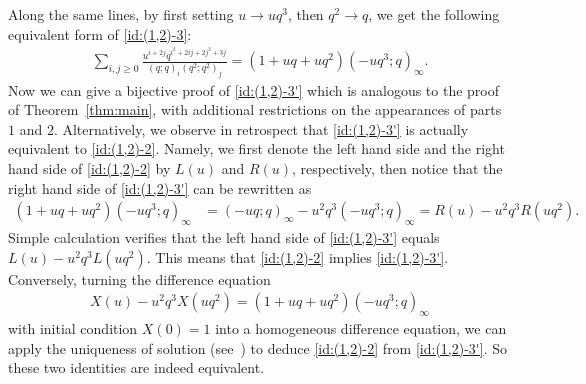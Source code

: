 \documentclass[11pt,reqno]{amsart}
\numberwithin{equation}{section}
\theoremstyle{plain}
\theoremstyle{definition}
\begin{document}
Along the same lines, by first setting $u\to uq^3$, then $q^2\to q$, we get the following equivalent form of \eqref{id:(1,2)-3}:
\begin{align}\label{id:(1,2)-3'}
\sum_{i, j\geq 0}\frac{u^{i+2j}q^{i^2+2ij+2j^2+3j}}{(q; q)_i(q^2; q^2)_j}=(1+uq+uq^2)(-uq^3; q)_{\infty}.
\end{align}
Now we can give a bijective proof of \eqref{id:(1,2)-3'} which is analogous to the proof of Theorem~\ref{thm:main}, with additional restrictions on the appearances of parts $1$ and $2$. Alternatively, we observe in retrospect that \eqref{id:(1,2)-3'} is actually equivalent to \eqref{id:(1,2)-2}. Namely, we first denote the left hand side and the right hand side of \eqref{id:(1,2)-2} by $L(u)$ and $R(u)$, respectively, then notice that the right hand side of \eqref{id:(1,2)-3'} can be rewritten as
 \begin{align*}
 (1+uq+uq^2)(-uq^3; q)_{\infty} &= (-uq;q)_{\infty}-u^2q^3(-uq^3;q)_{\infty}=R(u)-u^2q^3R(uq^2).
 \end{align*}
 Simple calculation verifies that the left hand side of \eqref{id:(1,2)-3'}
equals $L(u)-u^2q^3L(uq^2)$. This means that \eqref{id:(1,2)-2} implies \eqref{id:(1,2)-3'}. Conversely, turning the difference equation
\begin{align*}
X(u)-u^2q^3X(uq^2)=(1+uq+uq^2)(-uq^3;q)_{\infty}
\end{align*}
with initial condition $X(0)=1$ into a homogeneous difference equation, we can apply the uniqueness of solution (see~\cite[Lemma~1]{and68}) to deduce \eqref{id:(1,2)-2} from \eqref{id:(1,2)-3'}. So these two identities are indeed equivalent.
\end{document}
